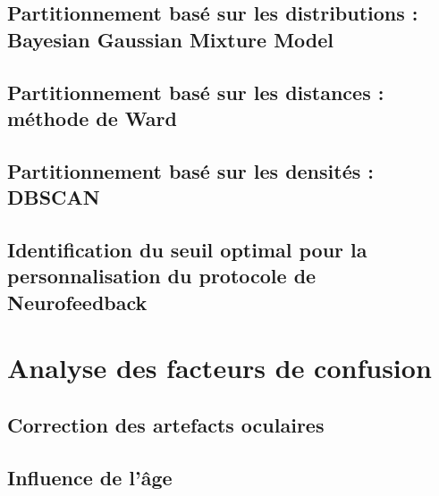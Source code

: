 \subsection{Partitionnement basé sur les distributions : Bayesian Gaussian Mixture Model}

\subsection{Partitionnement basé sur les distances : méthode de Ward}

\subsection{Partitionnement basé sur les densités : DBSCAN}

\subsection{Identification du seuil optimal pour la personnalisation du protocole de Neurofeedback}

\section{Analyse des facteurs de confusion}

\subsection{Correction des artefacts oculaires}

\subsection{Influence de l'âge}
